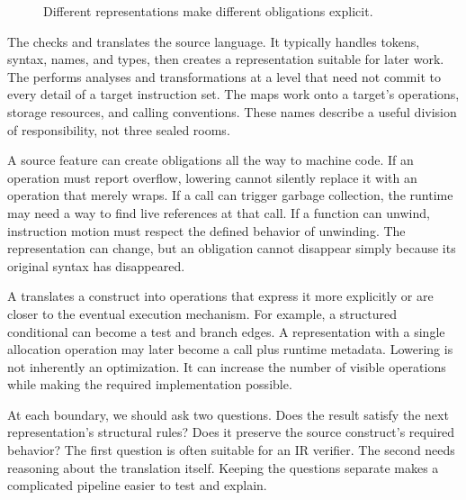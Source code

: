 \begin{figure}
  \centering
  \caption{Different representations make different obligations explicit.}
  \label{fig:first-pipeline}
\end{figure}

The  checks and translates the source language.
It typically handles tokens, syntax, names, and types, then creates a representation suitable for later work.
The  performs analyses and transformations at a level that need not commit to every detail of a target instruction set.
The  maps work onto a target's operations, storage resources, and calling conventions.
These names describe a useful division of responsibility, not three sealed rooms.

A source feature can create obligations all the way to machine code.
If an operation must report overflow, lowering cannot silently replace it with an operation that merely wraps.
If a call can trigger garbage collection, the runtime may need a way to find live references at that call.
If a function can unwind, instruction motion must respect the defined behavior of unwinding.
The representation can change, but an obligation cannot disappear simply because its original syntax has disappeared.

A  translates a construct into operations that express it more explicitly or are closer to the eventual execution mechanism.
For example, a structured conditional can become a test and branch edges.
A representation with a single allocation operation may later become a call plus runtime metadata.
Lowering is not inherently an optimization.
It can increase the number of visible operations while making the required implementation possible.

At each boundary, we should ask two questions.
Does the result satisfy the next representation's structural rules?
Does it preserve the source construct's required behavior?
The first question is often suitable for an IR verifier.
The second needs reasoning about the translation itself.
Keeping the questions separate makes a complicated pipeline easier to test and explain.

